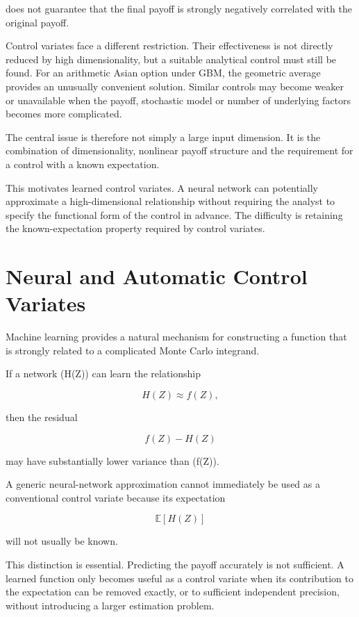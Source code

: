 \documentclass[12pt,a4paper]{report}
\begin{document}
does not guarantee that the final payoff is strongly negatively correlated with the original payoff.

Control variates face a different restriction. Their effectiveness is not directly reduced by high dimensionality, but a suitable analytical control must still be found. For an arithmetic Asian option under GBM, the geometric average provides an unusually convenient solution. Similar controls may become weaker or unavailable when the payoff, stochastic model or number of underlying factors becomes more complicated.

The central issue is therefore not simply a large input dimension. It is the combination of dimensionality, nonlinear payoff structure and the requirement for a control with a known expectation.

This motivates learned control variates. A neural network can potentially approximate a high-dimensional relationship without requiring the analyst to specify the functional form of the control in advance. The difficulty is retaining the known-expectation property required by control variates.

\section{Neural and Automatic Control Variates}

Machine learning provides a natural mechanism for constructing a function that is strongly related to a complicated Monte Carlo integrand.

If a network (H(Z)) can learn the relationship

\begin{equation}
H(Z)
\approx
f(Z),
\end{equation}

then the residual

\begin{equation}
f(Z)-H(Z)
\end{equation}

may have substantially lower variance than (f(Z)).

A generic neural-network approximation cannot immediately be used as a conventional control variate because its expectation

\begin{equation}
\mathbb{E}[H(Z)]
\end{equation}

will not usually be known.

This distinction is essential. Predicting the payoff accurately is not sufficient. A learned function only becomes useful as a control variate when its contribution to the expectation can be removed exactly, or to sufficient independent precision, without introducing a larger estimation problem.
\end{document}
